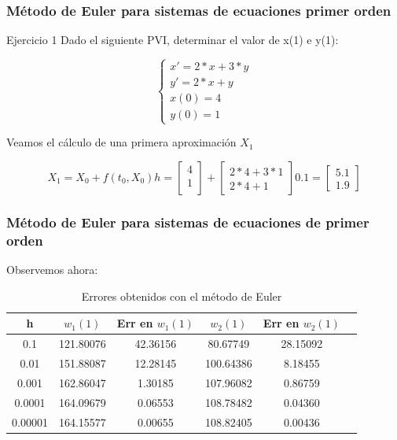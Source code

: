 \documentclass{beamer}
\begin{document}
\begin{frame}
	\frametitle{Método de Euler para sistemas de ecuaciones primer orden}
	\begin{block}{Ejercicio 1}
		Dado el siguiente PVI, determinar el valor de x(1) e y(1):
		
		$$
		\begin{cases}
		x' = 2*x + 3 * y\\
		y' = 2*x + y \\
		x(0) = 4\\
		y(0)=1
		\end{cases}
		$$
	\end{block}
	
	Veamos el cálculo de una primera aproximación $X_1$
	
	\begin{equation*}
	X_1=X_0+f(t_0,X_0)h=\begin{bmatrix}
	4\\
	1\\
	\end{bmatrix} + \begin{bmatrix}
	2*4 +3*1\\
	2*4 + 1
	\end{bmatrix}0.1=\begin{bmatrix}
	5.1\\
	1.9
	\end{bmatrix}  
	\end{equation*}
	
\end{frame}

\begin{frame}
	\frametitle{Método de Euler para sistemas de ecuaciones de primer orden}
	
	Observemos ahora:
	
	\begin{table}[H]
		\centering
		\setlength\extrarowheight{2.5pt}
		
		\begin{tabular}{|c|c|c|c|c|c}
			\hline
			\textbf{h} & {\textbf{$w_1(1)$}} & \textbf{Err en $w_1(1)$} & {\textbf{$w_2(1)$}} & \textbf{Err en $w_2(1)$} \\ 
			\hline
			0.1 & 121.80076 & 42.36156 & 80.67749 & 28.15092\\
			\hline
			0.01 & 151.88087 & 12.28145 & 100.64386 & 8.18455\\
			\hline
			0.001 & 162.86047 & 1.30185 & 107.96082 & 0.86759\\
			\hline
			0.0001 & 164.09679 & 0.06553 & 108.78482 & 0.04360\\
			\hline
			0.00001 & 164.15577 & 0.00655 & 108.82405 & 0.00436\\
			\hline   
		\end{tabular}
		
		\caption{Errores obtenidos con el método de Euler}           
	\end{table}
	
\end{frame}
\end{document}
